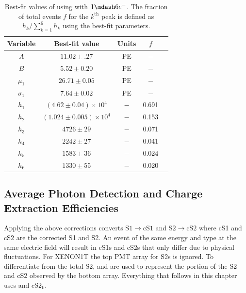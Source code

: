 \begin{table}
\centering
\begin{tabular}{ccccc}
\hline
\hline
Variable & Best-fit value & Units & $f$ \\
\hline
$A$ & $11.02 \pm .27$ & PE & $-$ \\
$B$ & $5.52 \pm 0.20$ & PE & $-$ \\
$\mu_1$ & $26.71 \pm 0.05$ & PE & $-$ \\
$\sigma_1$ & $7.64 \pm 0.02$ & PE & $-$ \\
$h_1$ & $(4.62 \pm 0.04) \times 10^4$ & $-$ & 0.691 \\
$h_2$ & $(1.024 \pm 0.005) \times 10^4$ & $-$ & 0.153 \\
$h_3$ & $4726 \pm 29$ & $-$ & 0.071 \\
$h_4$ & $2242 \pm 27$ & $-$ & 0.041 \\
$h_5$ & $1583 \pm 36$ & $-$ & 0.024 \\
$h_6$ & $1330 \pm 55$ & $-$ & 0.020 \\
\hline
\hline
\end{tabular}
\caption{Best-fit values of  using
 with $1 \mdash 6 e^-$.  The fraction of total events $f$ for the $k^{\mathrm{th}}$ peak is
defined as $h_k / \sum_{k = 1}^{6} h_k$ using the best-fit parameters.}
\label{tab:det_char_single_electron_gain_vals}
\end{table}



\subsection{Average Photon Detection and Charge Extraction Efficiencies}
\label{subsec:det_char_photon_charge_efficiencies}
Applying the above corrections converts $\mathrm{S1} \rightarrow \mathrm{cS1}$ and $\mathrm{S2} \rightarrow \mathrm{cS2}$ where cS1 and
cS2 are the corrected S1 and S2.  An event of the same energy and type at the same electric field will result in cS1s and
cS2s that only differ due to physical fluctuations.  For XENON1T the top PMT array for S2s is ignored.  To differentiate from the total S2,
\stwob and \cstwob are used to represent the portion
of the S2 and cS2 observed by the bottom array.  Everything that follows in this chapter uses \stwob and $\mathrm{cS2_b}$.

